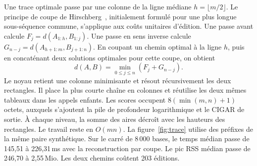 Une trace optimale passe par une colonne de la ligne médiane \(h=\lfloor m/2\rfloor\). Le principe de coupe de Hirschberg~\cite{hirschberg}, initialement formulé pour une plus longue sous-séquence commune, s'applique aux coûts unitaires d'édition. Une passe avant calcule \(F_j=d(A_{1:h},B_{1:j})\). Une passe en sens inverse calcule \(G_{n-j}=d(A_{h+1:m},B_{j+1:n})\). En coupant un chemin optimal à la ligne \(h\), puis en concaténant deux solutions optimales pour cette coupe, on obtient
\[
 d(A,B)=\min_{0\le j\le n}(F_j+G_{n-j}).
\]
Le noyau retient une colonne minimisante et résout récursivement les deux rectangles. Il place la plus courte chaîne en colonnes et réutilise les deux mêmes tableaux dans les appels enfants. Les scores occupent \(8(\min(m,n)+1)\) octets, auxquels s'ajoutent la pile de profondeur logarithmique et le CIGAR de sortie. À chaque niveau, la somme des aires décroît avec les hauteurs des rectangles. Le travail reste en \(O(mn)\).
La figure~\ref{fig:trace} utilise des préfixes de la même paire synthétique. Sur le carré de 8\,000 bases, le temps médian passe de 145,51 à 226,31\,ms avec la reconstruction par coupe. Le pic RSS médian passe de 246,70 à 2,55\,Mio. Les deux chemins coûtent 203 éditions.
